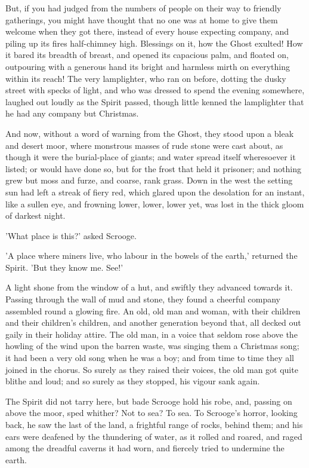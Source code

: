 But, if you had judged from the numbers of people on their way to
friendly gatherings, you might have thought that no one was at home to
give them welcome when they got there, instead of every house expecting
company, and piling up its fires half-chimney high. Blessings on it, how
the Ghost exulted! How it bared its breadth of breast, and opened its
capacious palm, and floated on, outpouring with a generous hand its
bright and harmless mirth on everything within its reach! The very
lamplighter, who ran on before, dotting the dusky street with specks of
light, and who was dressed to spend the evening somewhere, laughed out
loudly as the Spirit passed, though little kenned the lamplighter that
he had any company but Christmas.

And now, without a word of warning from the Ghost, they stood upon a
bleak and desert moor, where monstrous masses of rude stone were cast
about, as though it were the burial-place of giants; and water spread
itself wheresoever it listed; or would have done so, but for the frost
that held it prisoner; and nothing grew but moss and furze, and coarse,
rank grass. Down in the west the setting sun had left a streak of fiery
red, which glared upon the desolation for an instant, like a sullen eye,
and frowning lower, lower, lower yet, was lost in the thick gloom of
darkest night.

'What place is this?' asked Scrooge.

'A place where miners live, who labour in the bowels of the earth,'
returned the Spirit. 'But they know me. See!'

A light shone from the window of a hut, and swiftly they advanced
towards it. Passing through the wall of mud and stone, they found a
cheerful company assembled round a glowing fire. An old, old man and
woman, with their children and their children's children, and another
generation beyond that, all decked out gaily in their holiday attire.
The old man, in a voice that seldom rose above the howling of the wind
upon the barren waste, was singing them a Christmas song; it had been a
very old song when he was a boy; and from time to time they all joined
in the chorus. So surely as they raised their voices, the old man got
quite blithe and loud; and so surely as they stopped, his vigour sank
again.

The Spirit did not tarry here, but bade Scrooge hold his robe, and,
passing on above the moor, sped whither? Not to sea? To sea. To
Scrooge's horror, looking back, he saw the last of the land, a frightful
range of rocks, behind them; and his ears were deafened by the
thundering of water, as it rolled and roared, and raged among the
dreadful caverns it had worn, and fiercely tried to undermine the earth.

